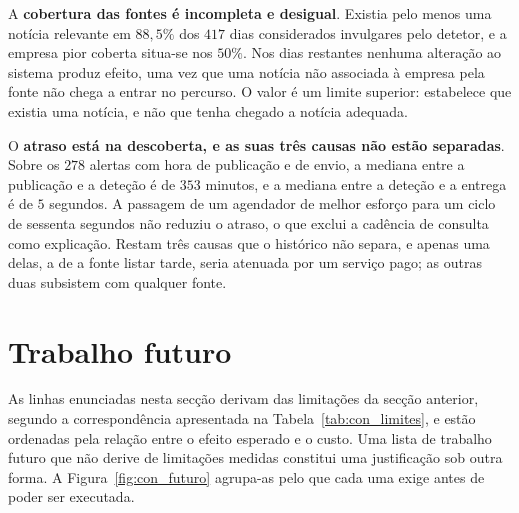 A \textbf{cobertura das fontes é incompleta e desigual}. Existia pelo menos uma notícia relevante em
$88{,}5\%$ dos $417$ dias considerados invulgares pelo detetor, e a empresa pior coberta situa-se
nos $50\%$. Nos dias restantes nenhuma alteração ao sistema produz efeito, uma vez que uma notícia
não associada à empresa pela fonte não chega a entrar no percurso. O valor é um limite superior:
estabelece que existia uma notícia, e não que tenha chegado a notícia adequada.

O \textbf{atraso está na descoberta, e as suas três causas não estão separadas}. Sobre os $278$ alertas
com hora de publicação e de envio, a mediana entre a publicação e a deteção é de $353$ minutos, e a
mediana entre a deteção e a entrega é de $5$ segundos. A passagem de um agendador de melhor esforço
para um ciclo de sessenta segundos não reduziu o atraso, o que exclui a cadência de consulta como
explicação. Restam três causas que o histórico não separa, e apenas uma delas, a de a fonte listar
tarde, seria atenuada por um serviço pago; as outras duas subsistem com qualquer fonte.

\section{Trabalho futuro}
\label{sec:con_futuro}

As linhas enunciadas nesta secção derivam das limitações da secção anterior, segundo a
correspondência apresentada na Tabela~\ref{tab:con_limites}, e estão ordenadas pela relação entre o
efeito esperado e o custo. Uma lista de trabalho futuro que não derive de limitações medidas
constitui uma justificação sob outra forma. A Figura~\ref{fig:con_futuro} agrupa-as pelo que
cada uma exige antes de poder ser executada.

